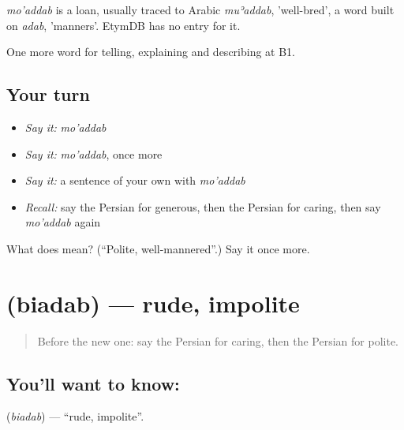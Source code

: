 \begin{cousinweb}
\emph{mo'addab} is a loan, usually traced to Arabic \emph{muʾaddab}, 'well-bred', a word built on \emph{adab}, 'manners'. EtymDB has no entry for it.
\end{cousinweb}

\begin{grammarlens}[title={What you've built}]
One more word for telling, explaining and describing at B1.
\end{grammarlens}

\subsection*{Your turn}
\begin{itemize}
\raggedright
  \item \emph{Say it:} \emph{mo'addab}
  \item \emph{Say it:} \emph{mo'addab}, once more
  \item \emph{Say it:} a sentence of your own with \emph{mo'addab}
  \item \emph{Recall:} say the Persian for generous, then the Persian for caring, then say \emph{mo'addab} again
\end{itemize}

\begin{tcolorbox}[breakable,colback=teal!4,colframe=teal!35!black,title={Before you move on}]
What does  mean? (\textquotedblleft{}Polite, well-mannered\textquotedblright{}.) Say it once more.
\end{tcolorbox}
\section[\texorpdfstring{\fa{بیادب} (biadab)}{بیادب (biadab)}]{ (biadab) — rude, impolite}

\label{lesson:FA-C489-biadab}



\begin{quote}
Before the new one: say the Persian for caring, then the Persian for polite.
\end{quote}

\subsection*{You'll want to know: }
\textbf{} (\emph{biadab}) — \textquotedblleft{}rude, impolite\textquotedblright{}.

